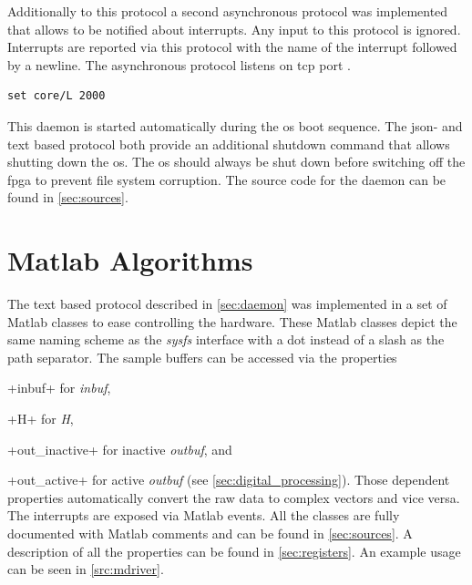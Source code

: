 \documentclass[12pt,a4paper,parskip=full,abstract=true,BCOR=12mm,twoside,open=right]{scrreprt}
\newcommand{\hack}{}
\newcommand*{\SavedLstInline}{}
\DeclareRobustCommand*{\lstinline}{%
  \ifmmode
    \let\SavedBGroup\bgroup
    \def\bgroup{%
      \let\bgroup\SavedBGroup
      \hbox\bgroup
    }%
  \fi
  \SavedLstInline
}
\def\device#1{\mbox{\textit{#1}}}
\begin{document}
Additionally to this protocol a second asynchronous
protocol was implemented that allows to be notified about interrupts. Any input to
this protocol is ignored. Interrupts are reported via this protocol with the name of the interrupt
followed by a newline. The asynchronous protocol listens on \gls{tcp} port {}.

\begin{lstlisting}[language={},float=htb,caption={Example line to set $\gls{L}=2000$ with the text based protocol},label=src:text,basicstyle=\hack\scriptsize]
set core/L 2000
\end{lstlisting}

This daemon is started automatically during the \gls{os} boot sequence. The \gls{json}- and
text based protocol both provide an additional shutdown command that allows shutting
down the \gls{os}. The \gls{os} should always be shut down before switching off the \gls{fpga}
to prevent file system corruption. The source code for the daemon can be found in \cref{sec:sources}.


\section{Matlab Algorithms}
\label{sec:matlab}
\lstset{language=Matlab}

The text based protocol described in \cref{sec:daemon} was implemented in a set of
Matlab classes to ease controlling the hardware. These Matlab classes depict the
same naming scheme as the \device{sysfs} interface with a dot instead of a slash
as the path separator. The sample buffers can be accessed via the properties
\lstinline+inbuf+ for \device{inbuf}, \lstinline+H+ for \device{H},
\lstinline+out_inactive+ for inactive \device{outbuf}, and \lstinline+out_active+
for active \device{outbuf} (see \cref{sec:digital_processing}). Those dependent properties automatically convert
the raw data to complex vectors and vice versa. The interrupts are exposed via
Matlab events. All the classes are fully documented with Matlab comments and
can be found in \cref{sec:sources}. A description of all the properties can
be found in \cref{sec:registers}. An example usage can be seen in \cref{src:mdriver}.
\end{document}
